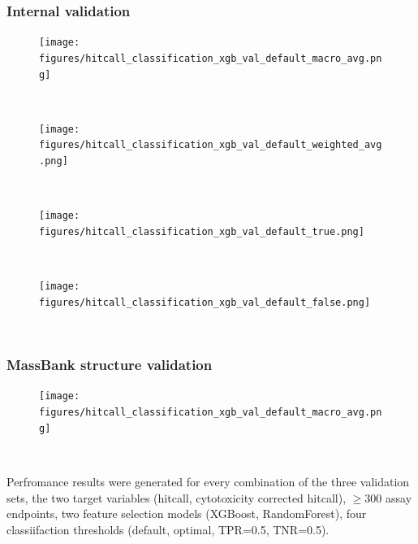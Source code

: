 \subsubsection{Internal validation}
\begin{figure}[h]
  \centering
  \texttt{[image: figures/hitcall\_classification\_xgb\_val\_default\_macro\_avg.png]}
  \caption{}
~\label{fig:hitcall_classification_xgb_val_default_macro_avg}
\end{figure}

\begin{figure}[h]
  \centering
  \texttt{[image: figures/hitcall\_classification\_xgb\_val\_default\_weighted\_avg.png]}
  \caption{}
~\label{fig:hitcall_classification_xgb_val_default_weighted_avg}
\end{figure}

\begin{figure}[h]
  \centering
  \texttt{[image: figures/hitcall\_classification\_xgb\_val\_default\_true.png]}
  \caption{}
~\label{fig:hitcall_classification_xgb_val_default_true}
\end{figure}

\begin{figure}[h]
  \centering
  \texttt{[image: figures/hitcall\_classification\_xgb\_val\_default\_false.png]}
  \caption{}
~\label{fig:hitcall_classification_xgb_val_default_false}
\end{figure}

\subsubsection{MassBank structure validation}
\begin{figure}[h]
  \centering
  \texttt{[image: figures/hitcall\_classification\_xgb\_val\_default\_macro\_avg.png]}
  \caption{}
  ~\label{fig:hitcall_classification_xgb_val_default_false}
\end{figure}


Perfromance results were generated for every combination of the three validation sets, the two target variables (hitcall, cytotoxicity corrected hitcall),  $\geq 300$ assay endpoints, two feature selection models (XGBoost, RandomForest), four classiifaction thresholds (default, optimal, TPR=0.5, TNR=0.5). 